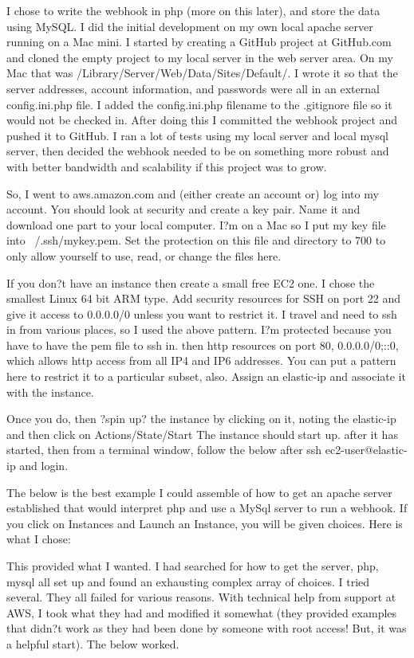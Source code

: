 \documentclass[final,letterpaper,12pt]{article}
\begin{document}
I chose to write the webhook in php (more on this later), and store the data using MySQL. I did the initial development on my own local apache server running on a Mac mini. I started by creating a GitHub project at GitHub.com and cloned the empty project to my local server in the web server area. On my Mac that was /Library/Server/Web/Data/Sites/Default/. I wrote it so that the server addresses, account information, and passwords were all in an external config.ini.php file. I added the config.ini.php filename to the .gitignore file so it would not be checked in. After doing this I committed the webhook project and pushed it to GitHub. I ran a lot of tests using my local server and local mysql server, then decided the webhook needed to be on something more robust and with better bandwidth and scalability if this project was to grow.

So, I went to aws.amazon.com and (either create an account or) log into my account. You should look at security and create a key pair. Name it and download one part to your local computer. I?m on a Mac so I put my key file into ~/.ssh/mykey.pem. Set the protection on this file and directory to 700 to only allow yourself to use, read, or change the files here.


If you don?t have an instance then create a small free EC2 one. I chose the smallest Linux 64 bit ARM type. Add security resources for SSH on port 22 and give it access to 0.0.0.0/0 unless you want to restrict it. I travel and need to ssh in from various places, so I used the above pattern. I?m protected because you have to have the pem file to ssh in. 
then http resources on port 80, 0.0.0.0/0;::0, which allows http access from all IP4 and IP6 addresses. You can put a pattern here to restrict it to a particular subset, also.
Assign an elastic-ip and associate it with the instance.

Once you do, then ?spin up? the instance by clicking on it, noting the elastic-ip and then click on Actions/State/Start
The instance should start up. after it has started, then from a terminal window, follow the below after ssh ec2-user@elastic-ip and login.

The below is the best example I could assemble of how to get an apache server established that would interpret php and use a MySql server to run a webhook. If you click on Instances and Launch an Instance, you will be given choices. Here is what I chose:



This provided what I wanted.
I had searched for how to get the server, php, mysql all set up and found an exhausting complex array of choices. I tried several. They all failed for various reasons. With technical help from support at AWS, I took what they had and modified it somewhat (they provided examples that didn?t work as they had been done by someone with root access! But, it was a helpful start). The below worked.
\end{document}
